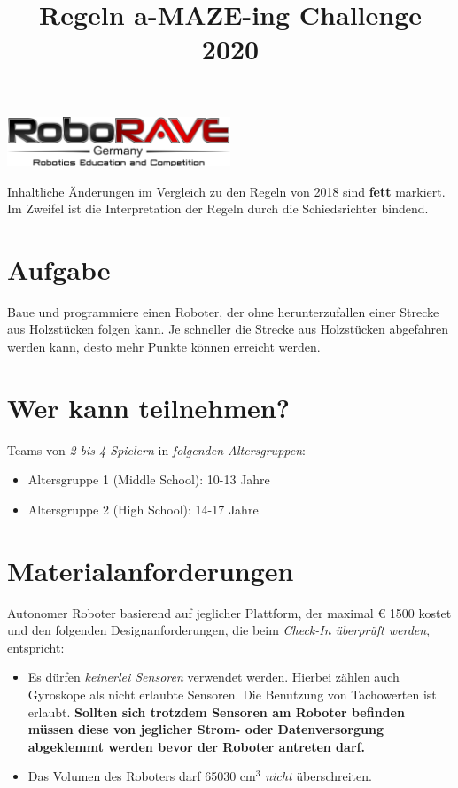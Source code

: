 \documentclass[a4paper,12pt]{article}
\begin{document}
\title{Regeln a-MAZE-ing Challenge 2020}

\makeatletter
\let\inserttitle\@title
\makeatother

 \begin{center}
\includegraphics[width=0.5\textwidth]{logo.png}

\huge                      %
\bfseries                   %
\inserttitle
  \end{center}
Inhaltliche Änderungen im Vergleich zu den Regeln von 2018 sind \textbf{fett} markiert. Im Zweifel ist die Interpretation der Regeln durch die Schiedsrichter bindend.


\section{Aufgabe}
Baue und programmiere einen Roboter, der ohne herunterzufallen einer Strecke aus Holzstücken folgen
kann. Je schneller die Strecke aus Holzstücken abgefahren werden kann, desto mehr Punkte können erreicht
werden.

\section{Wer kann teilnehmen?}
Teams von \emph{2 bis 4 Spielern} in \emph{folgenden Altersgruppen}:
\begin{itemize}
	\item Altersgruppe 1 (Middle School): 10-13 Jahre
	\item Altersgruppe 2 (High School): 14-17 Jahre
\end{itemize}

\section{Materialanforderungen}
Autonomer Roboter basierend auf jeglicher Plattform, der maximal  \euro{ 1500} kostet und den folgenden
Designanforderungen, die beim \emph{Check-In überprüft werden}, entspricht:
\begin{itemize}
\item Es dürfen \emph{keinerlei Sensoren} verwendet werden. Hierbei zählen auch
Gyroskope als nicht erlaubte Sensoren. Die Benutzung von Tachowerten ist erlaubt.
\textbf{Sollten sich trotzdem Sensoren am Roboter befinden müssen diese von jeglicher Strom- oder
Datenversorgung abgeklemmt werden bevor der Roboter antreten darf.}
\item Das Volumen des Roboters darf 65030 cm$^{3}$ \emph{nicht} überschreiten.
\end{itemize}
\end{document}
